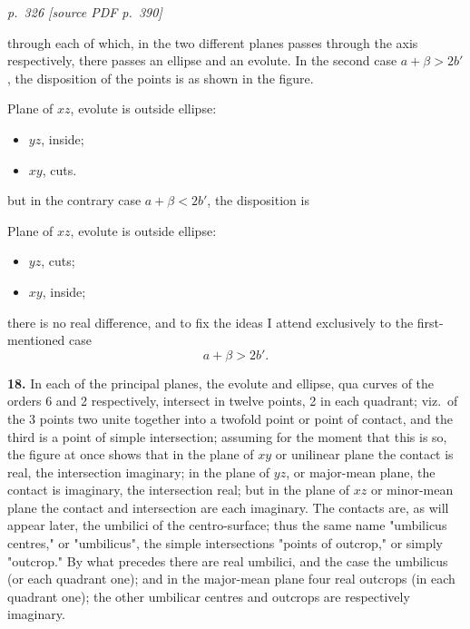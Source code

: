 \documentclass[11pt,a4paper]{article}
\newcommand{\pagemarker}[2]{\par\bigskip\noindent\textit{p.~#1 [source PDF p.~#2]}\par\smallskip}
\begin{document}
\clearpage

\pagemarker{326}{390}

through each of which, in the two different planes passes through the axis respectively, there passes an ellipse and an evolute. In the second case $a + \beta > 2b'$, the disposition of the points is as shown in the figure.

\begin{center}
\end{center}

Plane of $xz$, evolute is outside ellipse:
\begin{itemize}[leftmargin=2em]
\item[] $yz$, inside;
\item[] $xy$, cuts.
\end{itemize}

but in the contrary case $a + \beta < 2b'$, the disposition is

Plane of $xz$, evolute is outside ellipse:
\begin{itemize}[leftmargin=2em]
\item[] $yz$, cuts;
\item[] $xy$, inside;
\end{itemize}

there is no real difference, and to fix the ideas I attend exclusively to the first-mentioned case
\[
a + \beta > 2b'.
\]

\textbf{18.} In each of the principal planes, the evolute and ellipse, qua curves of the orders 6 and 2 respectively, intersect in twelve points, 2 in each quadrant; viz.\ of the 3 points two unite together into a twofold point or point of contact, and the third is a point of simple intersection; assuming for the moment that this is so, the figure at once shows that in the plane of $xy$ or unilinear plane the contact is real, the intersection imaginary; in the plane of $yz$, or major-mean plane, the contact is imaginary, the intersection real; but in the plane of $xz$ or minor-mean plane the contact and intersection are each imaginary. The contacts are, as will appear later, the umbilici of the centro-surface; thus the same name "umbilicus centres," or "umbilicus", the simple intersections "points of outcrop," or simply "outcrop." By what precedes there are real umbilici, and the case the umbilicus (or each quadrant one); and in the major-mean plane four real outcrops (in each quadrant one); the other umbilicar centres and outcrops are respectively imaginary.
\end{document}
